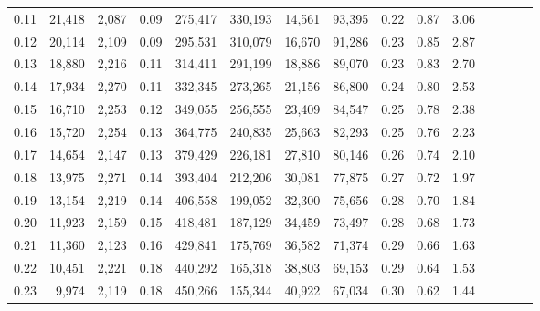 \begin{tabular}{rrrcrrrrrrrrrrr}
0.11 &  21,418 &  2,087 &                                       0.09 &  275,417 &  330,193 &   14,561 &   93,395 &  0.22 &  0.87 &                         3.06 \\
0.12 &  20,114 &  2,109 &                                       0.09 &  295,531 &  310,079 &   16,670 &   91,286 &  0.23 &  0.85 &                         2.87 \\
0.13 &  18,880 &  2,216 &                                       0.11 &  314,411 &  291,199 &   18,886 &   89,070 &  0.23 &  0.83 &                         2.70 \\
0.14 &  17,934 &  2,270 &                                       0.11 &  332,345 &  273,265 &   21,156 &   86,800 &  0.24 &  0.80 &                         2.53 \\
0.15 &  16,710 &  2,253 &                                       0.12 &  349,055 &  256,555 &   23,409 &   84,547 &  0.25 &  0.78 &                         2.38 \\
0.16 &  15,720 &  2,254 &                                       0.13 &  364,775 &  240,835 &   25,663 &   82,293 &  0.25 &  0.76 &                         2.23 \\
0.17 &  14,654 &  2,147 &                                       0.13 &  379,429 &  226,181 &   27,810 &   80,146 &  0.26 &  0.74 &                         2.10 \\
0.18 &  13,975 &  2,271 &                                       0.14 &  393,404 &  212,206 &   30,081 &   77,875 &  0.27 &  0.72 &                         1.97 \\
0.19 &  13,154 &  2,219 &                                       0.14 &  406,558 &  199,052 &   32,300 &   75,656 &  0.28 &  0.70 &                         1.84 \\
0.20 &  11,923 &  2,159 &                                       0.15 &  418,481 &  187,129 &   34,459 &   73,497 &  0.28 &  0.68 &                         1.73 \\
0.21 &  11,360 &  2,123 &                                       0.16 &  429,841 &  175,769 &   36,582 &   71,374 &  0.29 &  0.66 &                         1.63 \\
0.22 &  10,451 &  2,221 &                                       0.18 &  440,292 &  165,318 &   38,803 &   69,153 &  0.29 &  0.64 &                         1.53 \\
0.23 &   9,974 &  2,119 &                                       0.18 &  450,266 &  155,344 &   40,922 &   67,034 &  0.30 &  0.62 &                         1.44 \\

\end{tabular}

